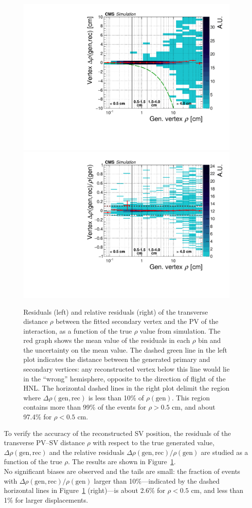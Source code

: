 \begin{figure}[h!]
  \centering
  \includegraphics[width=.48\textwidth]{Figures/c6/selection/genvtx_recvtx_Drho_vs_rho_afterSel_zoom.pdf}
  \includegraphics[width=.48\textwidth]{Figures/c6/selection/genvtx_recvtx_RelDrho_vs_rho_afterSel_zoom.pdf}
  \caption{Residuals (left) and relative residuals (right) of the
    transverse distance $\rho$ between the fitted secondary vertex and
    the PV of the interaction, as a function of the true $\rho$ value
    from simulation. 
    The red graph shows the mean value of the
    residuals in each $\rho$ bin and the uncertainty on the mean
    value. The dashed green line in the left plot indicates the
    distance between the generated primary and secondary vertices: any
    reconstructed vertex below this line would lie in the ``wrong''
    hemisphere, opposite to the direction of flight of the HNL.
    The horizontal dashed lines in the right plot delimit the region
    where $\Delta\rho(\mathrm{gen,rec})$ is less than 10\% of
    $\rho(\mathrm{gen})$. This region contains more than 99\% of
    the events for $\rho>0.5$ cm, and about 97.4\% for $\rho<0.5$ cm.
    \dani}
  \label{fig:svResidVsRho_all}
\end{figure}

To verify the accuracy of the reconstructed SV position, the residuals of the
transverse PV--SV distance $\rho$ with respect to the true generated
value, $\Delta\rho(\mathrm{gen,rec})$ and the relative residuals
$\Delta\rho(\mathrm{gen,rec})/\rho(\mathrm{gen})$ are studied as a
function of the true $\rho$. The results are shown in
Figure~\ref{fig:svResidVsRho_all}.\\
No significant biases are observed and
the tails are small: the fraction of events with
$\Delta\rho(\mathrm{gen,rec})/\rho(\mathrm{gen})$ larger than
10\%---indicated by the dashed horizontal lines in
Figure~\ref{fig:svResidVsRho_all} (right)---is about 2.6\% for
$\rho<0.5$ cm, and less than 1\% for larger
displacements.

